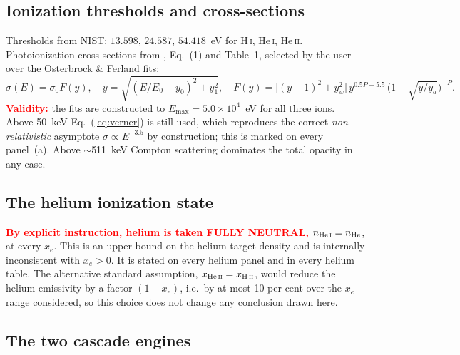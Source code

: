 \documentclass[11pt,a4paper]{article}
\newcommand{\flag}[1]{\textbf{\textcolor{red}{#1}}}
\begin{document}
\subsection{Ionization thresholds and cross-sections}
Thresholds from NIST: $13.598$, $24.587$, $54.418$~eV for
H\,\textsc{i}, He\,\textsc{i}, He\,\textsc{ii}.  Photoionization
cross-sections from \citet{Verner1996}, Eq.~(1) and Table~1, selected by the
user over the Osterbrock \& Ferland fits:
\begin{equation}
  \sigma(E) = \sigma_0 F(y),\quad
  y = \sqrt{(E/E_0 - y_0)^2 + y_1^2},\quad
  F(y) = \big[(y-1)^2 + y_w^2\big]\, y^{0.5P-5.5}\,
         \big(1+\sqrt{y/y_a}\big)^{-P}.
  \label{eq:verner}
\end{equation}
\flag{Validity:} the fits are constructed to $E_{\max}=5.0\times10^{4}$~eV for
all three ions.  Above 50~keV Eq.~(\ref{eq:verner}) is still used, which
reproduces the correct \emph{non-relativistic} asymptote $\sigma\propto
E^{-3.5}$ by construction; this is marked on every panel~(a).  Above
$\sim$511~keV Compton scattering dominates the total opacity in any case.

\subsection{The helium ionization state}
\flag{By explicit instruction, helium is taken FULLY NEUTRAL,}
$n_{\rm He\,\textsc{i}} = n_{\rm He}$, at every $x_e$.  This is an upper bound
on the helium target density and is internally inconsistent with $x_e>0$.  It
is stated on every helium panel and in every helium table.  The alternative
standard assumption, $x_{\rm He\,\textsc{ii}} = x_{\rm H\,\textsc{ii}}$, would
reduce the helium emissivity by a factor $(1-x_e)$, i.e.\ by at most 10 per
cent over the $x_e$ range considered, so this choice does not change any
conclusion drawn here.

\subsection{The two cascade engines}
\end{document}
